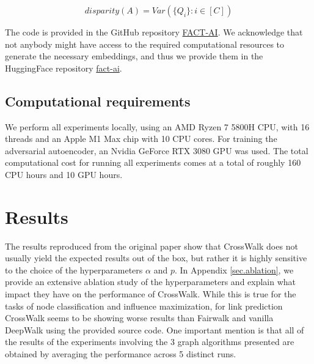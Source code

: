 \begin{equation}
    disparity(A) = Var(\{Q_{i}\} : i \in [C])
\end{equation}

The code is provided in the GitHub repository \href{https://anonymous.4open.science/r/FACT-AI-4674}{FACT-AI}. We acknowledge that not anybody might have access to the required computational resources to generate the necessary embeddings, and thus we provide them in the HuggingFace repository \href{https://huggingface.co/datasets/lucapantea/fact-ai}{fact-ai}.





\subsection{Computational requirements}
We perform all experiments locally, using an AMD Ryzen 7 5800H CPU, with 16 threads and an Apple M1 Max chip with 10 CPU cores. For training the adversarial autoencoder, an Nvidia GeForce RTX 3080 GPU was used. The total computational cost for running all experiments comes at a total of roughly 160 CPU hours and 10 GPU hours. 

\section{Results}
\label{sec:results}

The results reproduced from the original paper show that CrossWalk does not usually yield the expected results out of the box, but rather it is highly sensitive to the choice of the hyperparameters $\alpha$ and $p$. In Appendix \ref{sec.ablation}, we provide an extensive ablation study of the hyperparameters and explain what impact they have on the performance of CrossWalk. While this is true for the tasks of node classification and influence maximization, for link prediction CrossWalk seems to be showing worse results than Fairwalk and vanilla DeepWalk using the provided source code. One important mention is that all of the results of the experiments involving the 3 graph algorithms presented are obtained by averaging the performance across 5 distinct runs.


